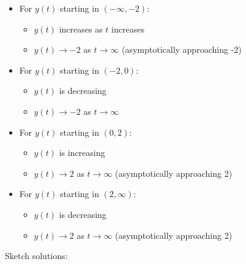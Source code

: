 \documentclass{article}
\begin{document}
\begin{itemize}
    \item For $y(t)$ starting in $(-\infty, -2)$:
        \begin{itemize}
            \item $y(t)$ increases as $t$ increases
            \item $y(t) \rightarrow -2$ as $t \rightarrow \infty$ (asymptotically approaching -2)
        \end{itemize}
    
    \item For $y(t)$ starting in $(-2, 0)$:
        \begin{itemize}
            \item $y(t)$ is decreasing
            \item $y(t) \rightarrow -2$ as $t \rightarrow \infty$
        \end{itemize}
    
    \item For $y(t)$ starting in $(0, 2)$:
        \begin{itemize}
            \item $y(t)$ is increasing
            \item $y(t) \rightarrow 2$ as $t \rightarrow \infty$ (asymptotically approaching 2)
        \end{itemize}
    
    \item For $y(t)$ starting in $(2, \infty)$:
        \begin{itemize}
            \item $y(t)$ is decreasing
            \item $y(t) \rightarrow 2$ as $t \rightarrow \infty$ (asymptotically approaching 2)
        \end{itemize}
\end{itemize}


Sketch solutions:
\end{document}
